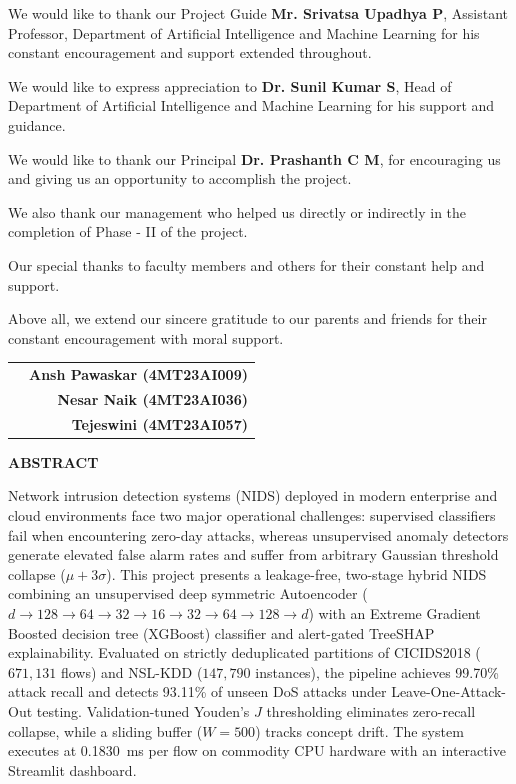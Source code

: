 \documentclass[12pt,a4paper]{report}
\begin{document}
We would like to thank our Project Guide \textbf{Mr. Srivatsa Upadhya P}, Assistant Professor, Department of Artificial Intelligence and Machine Learning for his constant encouragement and support extended throughout.

We would like to express appreciation to \textbf{Dr. Sunil Kumar S}, Head of Department of Artificial Intelligence and Machine Learning for his support and guidance.

We would like to thank our Principal \textbf{Dr. Prashanth C M}, for encouraging us and giving us an opportunity to accomplish the project.

We also thank our management who helped us directly or indirectly in the completion of Phase - II of the project.

Our special thanks to faculty members and others for their constant help and support.

Above all, we extend our sincere gratitude to our parents and friends for their constant encouragement with moral support.\par\vspace{1.2cm}

\noindent
\begin{tabularx}{\textwidth}{X r}
& \textbf{Ansh Pawaskar (4MT23AI009)} \\
& \textbf{Nesar Naik (4MT23AI036)} \\
& \textbf{Tejeswini (4MT23AI057)}
\end{tabularx}

\clearpage
{}
\setcounter{page}{5}
\thispagestyle{plain}

\begin{center}
{\Large\bfseries ABSTRACT}\\[0.6cm]
\end{center}

Network intrusion detection systems (NIDS) deployed in modern enterprise and cloud environments face two major operational challenges: supervised classifiers fail when encountering zero-day attacks, whereas unsupervised anomaly detectors generate elevated false alarm rates and suffer from arbitrary Gaussian threshold collapse ($\mu + 3\sigma$). This project presents a leakage-free, two-stage hybrid NIDS combining an unsupervised deep symmetric Autoencoder ($d \to 128 \to 64 \to 32 \to 16 \to 32 \to 64 \to 128 \to d$) with an Extreme Gradient Boosted decision tree (XGBoost) classifier and alert-gated TreeSHAP explainability. Evaluated on strictly deduplicated partitions of CICIDS2018 ($671{,}131$ flows) and NSL-KDD ($147{,}790$ instances), the pipeline achieves 99.70\% attack recall and detects 93.11\% of unseen DoS attacks under Leave-One-Attack-Out testing. Validation-tuned Youden's $J$ thresholding eliminates zero-recall collapse, while a sliding buffer ($W=500$) tracks concept drift. The system executes at 0.1830~ms per flow on commodity CPU hardware with an interactive Streamlit dashboard.\par\vspace{0.6cm}
\end{document}
